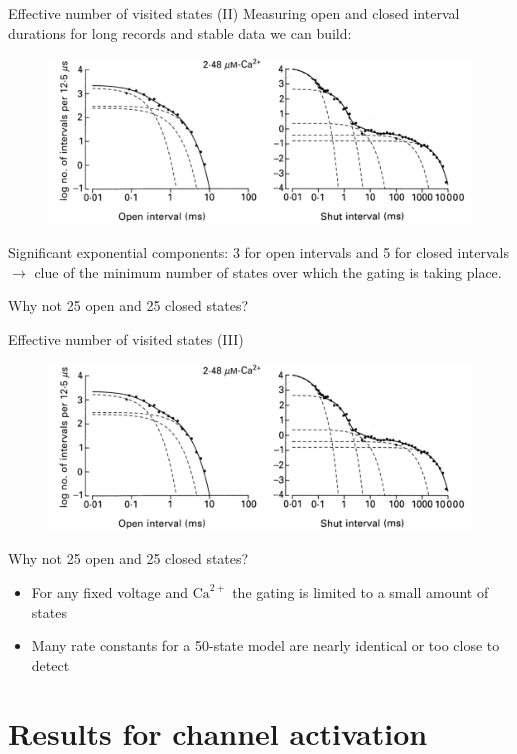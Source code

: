 \documentclass{beamer}
\newcommand{\ca}{\text{Ca}^{2+}}
\begin{document}
\begin{frame}{Effective number of visited states (II)}
Measuring open and closed interval durations for long records and stable data we can build:
\begin{figure}
\centering
\includegraphics[width=.7\textwidth]{Ca_activation_time_interv_distrib.png}
\end{figure}
Significant exponential components: 3 for open intervals and 5 for closed intervals $\rightarrow$ clue of the minimum number of states over which the gating is taking place.

Why not 25 open and 25 closed states?

\end{frame}

\begin{frame}{Effective number of visited states (III)}
\begin{figure}
\centering
\includegraphics[width=.7\textwidth]{Ca_activation_time_interv_distrib.png}
\end{figure}
Why not 25 open and 25 closed states?
\begin{itemize}
	\item For any fixed voltage and $\ca$ the gating is limited to a small amount of states
	\item Many rate constants for a 50-state model are nearly identical or too close to detect
\end{itemize}

\end{frame}

\section{Results for channel activation}
\end{document}
